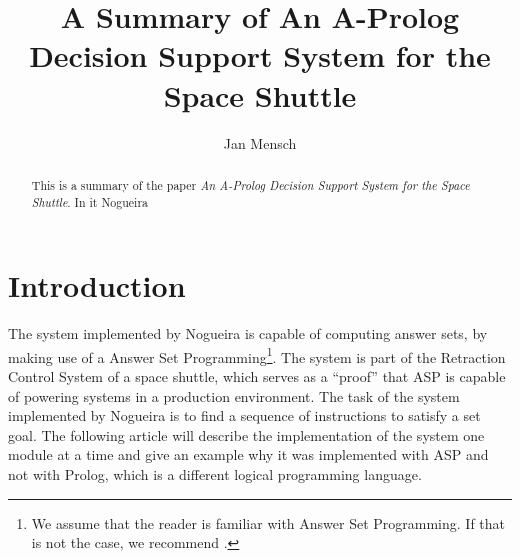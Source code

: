 \documentclass[runningheads]{llncs}
\newcommand{\papertitle}{An A-Prolog Decision Support System for the Space Shuttle}
\newcommand{\authorquote}{Nogueira \etal}
\begin{document}
\title{A Summary of \papertitle}

\author{Jan Mensch}




%
\maketitle              %
%
\begin{abstract}
This is a summary of the paper \textit{\papertitle}\cite{nogueira2001prolog}. In it \authorquote{}   


\end{abstract}

\section{Introduction} \label{sec:intro}

The system implemented by \authorquote{} is capable of computing answer sets, by making use of a Answer Set Programming\footnote{We assume that the reader is familiar with Answer Set Programming. If that is not the case, we recommend \cite{erdem2016applications}.}. The system is part of the Retraction Control System of a space shuttle, which serves as a ``proof'' that ASP is capable of powering systems in a production environment. The task of the system implemented by \authorquote{} is to find a sequence of instructions to satisfy a set goal. The following article will describe the implementation of the system one module at a time and give an example why it was implemented with ASP and not with Prolog, which is a different logical programming language. 
\end{document}
